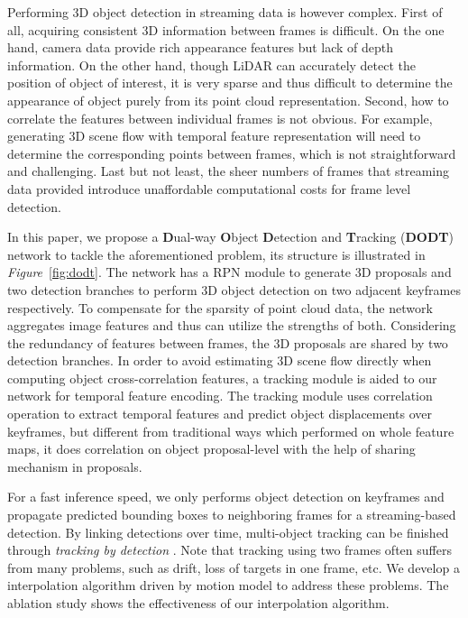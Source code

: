 \documentclass[letterpaper, 10 pt, conference]{ieeeconf}  %
\def\figurename{\emph{Figure}}
\begin{document}
Performing 3D object detection in streaming data is however complex. First of all, acquiring consistent 3D information between frames is difficult. On the one hand, camera data provide rich appearance features but lack of depth information. On the other hand, though LiDAR can accurately detect the position of object of interest, it is very sparse and thus difficult to determine the appearance of object purely from its point cloud representation. Second, how to correlate the features between individual frames is not obvious. For example, generating 3D scene flow with temporal feature representation will need to determine the corresponding points between frames, which is not straightforward and challenging. Last but not least, the sheer numbers of frames that streaming data provided introduce unaffordable computational costs for frame level detection. 

In this paper, we propose a \textbf{D}ual-way \textbf{O}bject \textbf{D}etection and \textbf{T}racking (\textbf{DODT}) network to tackle the aforementioned problem, its structure is illustrated in \figurename \, \ref{fig:dodt}. The network has a RPN module to generate 3D proposals and two detection branches to perform 3D object detection on two adjacent keyframes respectively. To compensate for the sparsity of point cloud data, the network aggregates image features and thus can utilize the strengths of both. Considering the redundancy of features between frames, the 3D proposals are shared by two detection branches. In order to avoid estimating 3D scene flow directly when computing object cross-correlation features, a tracking module is aided to our network for temporal feature encoding. The tracking module uses correlation operation to extract temporal features and predict object displacements over keyframes, but different from traditional ways which performed on whole feature maps, it does correlation on object proposal-level with the help of sharing mechanism in proposals. 

For a fast inference speed, we only performs object detection on keyframes and propagate predicted bounding boxes to neighboring frames for a streaming-based detection. By linking detections over time, multi-object tracking can be finished through \textit{tracking by detection} \cite{lenz2015followme}. Note that tracking using two frames often suffers from many problems, such as drift, loss of targets in one frame, etc. We develop a interpolation algorithm driven by motion model to address these problems. The ablation study shows the effectiveness of our interpolation algorithm.
\end{document}
